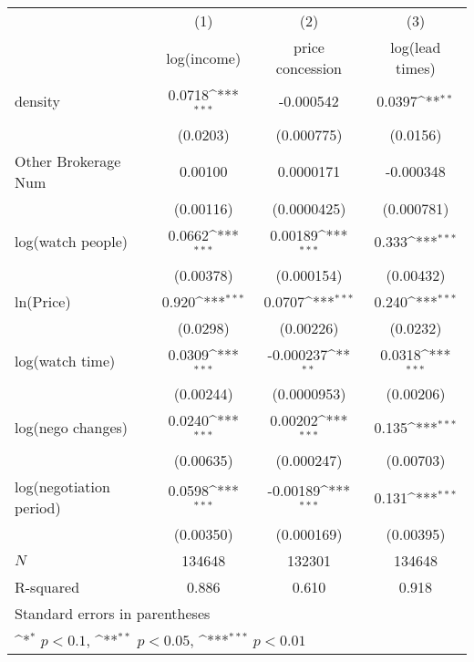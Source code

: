 {
\def\sym#1{\ifmmode^{#1}\else\(^{#1}\)\fi}
\begin{tabular}{l*{3}{c}}
\toprule
            &\multicolumn{1}{c}{(1)}&\multicolumn{1}{c}{(2)}&\multicolumn{1}{c}{(3)}\\
            &\multicolumn{1}{c}{log(income)}&\multicolumn{1}{c}{price concession}&\multicolumn{1}{c}{log(lead times)}\\
\midrule
density     &      0.0718\sym{***}&   -0.000542         &      0.0397\sym{**} \\
            &    (0.0203)         &  (0.000775)         &    (0.0156)         \\
\addlinespace
Other Brokerage Num  &     0.00100         &   0.0000171         &   -0.000348         \\
            &   (0.00116)         & (0.0000425)         &  (0.000781)         \\
\addlinespace
log(watch people)&      0.0662\sym{***}&     0.00189\sym{***}&       0.333\sym{***}\\
            &   (0.00378)         &  (0.000154)         &   (0.00432)         \\
\addlinespace
ln(Price)&       0.920\sym{***}&      0.0707\sym{***}&       0.240\sym{***}\\
            &    (0.0298)         &   (0.00226)         &    (0.0232)         \\
\addlinespace
log(watch time)&      0.0309\sym{***}&   -0.000237\sym{**} &      0.0318\sym{***}\\
            &   (0.00244)         & (0.0000953)         &   (0.00206)         \\
\addlinespace
log(nego changes)&      0.0240\sym{***}&     0.00202\sym{***}&       0.135\sym{***}\\
            &   (0.00635)         &  (0.000247)         &   (0.00703)         \\
\addlinespace
log(negotiation period)&      0.0598\sym{***}&    -0.00189\sym{***}&       0.131\sym{***}\\
            &   (0.00350)         &  (0.000169)         &   (0.00395)         \\
\midrule
\(N\)       &      134648         &      132301         &      134648         \\
R-squared   &       0.886         &       0.610         &       0.918         \\
\bottomrule
\multicolumn{4}{l}{\footnotesize Standard errors in parentheses}\\
\multicolumn{4}{l}{\footnotesize \sym{*} \(p<0.1\), \sym{**} \(p<0.05\), \sym{***} \(p<0.01\)}\\
\end{tabular}
}
